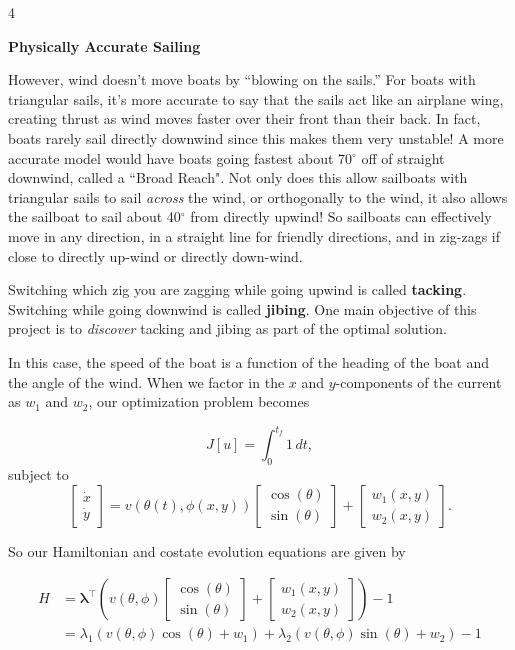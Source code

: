 \documentclass[a0]{a0poster}
\newcommand{\NumColumns}{4}
\begin{document}
\begin{minipage}{\linewidth}
\begin{multicols*}{\NumColumns}
\columnbreak
\begin{center}
\LARGE{\textbf{Physically Accurate Sailing}}
\end{center}
\vspace{1cm}
\large However, wind doesn't move boats by ``blowing on the sails.'' For boats with triangular sails, it's more accurate to say that the sails act like an airplane wing, creating thrust as wind moves faster over their front than their back. In fact, boats rarely sail directly downwind since this makes them very unstable! A more accurate model would have boats going fastest about 70$^\circ$ off of straight downwind, called a ``Broad Reach". Not only does this allow sailboats with triangular sails to sail \textit{across} the wind, or orthogonally to the wind, it also allows the sailboat to sail about 40$^\circ$ from directly upwind! So sailboats can effectively move in any direction, in a straight line for friendly directions, and in zig-zags if close to directly up-wind or directly down-wind. 

Switching which zig you are zagging while going upwind is called \textbf{tacking}. Switching while going downwind is called \textbf{jibing}. One main objective of this project is to \textit{discover} tacking and jibing as part of the optimal solution.

In this case, the speed of the boat is a function of the heading of the boat and the angle of the wind. When we factor in the $x$ and $y$-components of the current as $w_1$ and $w_2$, our optimization problem becomes

$$J[u] = \int_0^{t_f} 1 \,dt,$$ 
subject to
$$\begin{bmatrix} \dot{x} \\ \dot{y} \end{bmatrix} = v(\theta(t), \phi(x,y)) \begin{bmatrix} \cos(\theta) \\ \sin(\theta) \end{bmatrix} + \begin{bmatrix} w_1(x, y) \\ w_2(x, y) \end{bmatrix}.$$


So our Hamiltonian and costate evolution equations are given by

$$ 
\begin{aligned}
H &= \boldsymbol{\lambda}^\top \left(v(\theta, \phi) \begin{bmatrix} \cos(\theta) \\ \sin(\theta) \end{bmatrix} + \begin{bmatrix} w_1(x, y) \\ w_2(x, y) \end{bmatrix}\right) - 1\\
&= \lambda_1(v(\theta, \phi)\cos(\theta) + w_1)+ \lambda_2(v(\theta, \phi)\sin(\theta) + w_2) - 1
\end{aligned}
$$


\end{multicols*}
\end{minipage}
\end{document}

